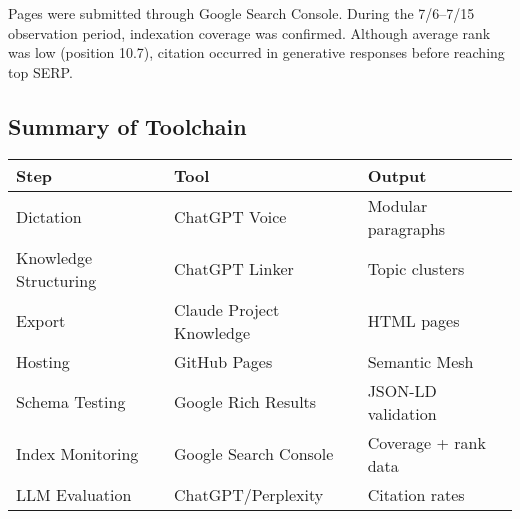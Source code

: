 Pages were submitted through Google Search Console. During the 7/6--7/15 observation period, indexation coverage was confirmed. Although average rank was low (position 10.7), citation occurred in generative responses before reaching top SERP.

\subsection{Summary of Toolchain}

\begin{center}
\begin{tabular}{|l|l|l|}
\hline
\textbf{Step} & \textbf{Tool} & \textbf{Output} \\
\hline
Dictation & ChatGPT Voice & Modular paragraphs \\
Knowledge Structuring & ChatGPT Linker & Topic clusters \\
Export & Claude Project Knowledge & HTML pages \\
Hosting & GitHub Pages & Semantic Mesh \\
Schema Testing & Google Rich Results & JSON-LD validation \\
Index Monitoring & Google Search Console & Coverage + rank data \\
LLM Evaluation & ChatGPT/Perplexity & Citation rates \\
\hline
\end{tabular}
\end{center}
